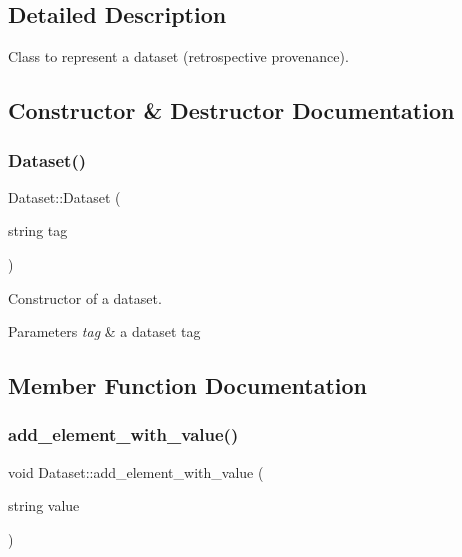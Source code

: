 \subsection{Detailed Description}
Class to represent a dataset (retrospective provenance). 

\subsection{Constructor \& Destructor Documentation}
\mbox{\label{classDataset_a6eb00c4455a2d16ca5100996fd28ddf8}} 
\subsubsection{\texorpdfstring{Dataset()}{Dataset()}}
{\footnotesize\ttfamily Dataset\+::\+Dataset (\begin{DoxyParamCaption}\item[{string}]{tag }\end{DoxyParamCaption})\hspace{0.3cm}{\ttfamily [inline]}}

Constructor of a dataset. 
\begin{DoxyParams}{Parameters}
{\em tag} & a dataset tag \\
\hline
\end{DoxyParams}


\subsection{Member Function Documentation}
\mbox{\label{classDataset_a86a705d9b163d64e812a085acbfb0a81}} 
\subsubsection{\texorpdfstring{add\+\_\+element\+\_\+with\+\_\+value()}{add\_element\_with\_value()}}
{\footnotesize\ttfamily void Dataset\+::add\+\_\+element\+\_\+with\+\_\+value (\begin{DoxyParamCaption}\item[{string}]{value }\end{DoxyParamCaption})}

